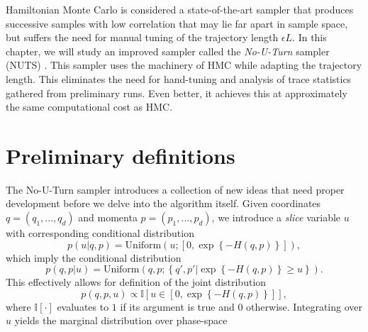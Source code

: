 Hamiltonian Monte Carlo is considered a state-of-the-art sampler that produces successive samples with low correlation
that may lie far apart in sample space, 
but suffers the need for manual tuning of the trajectory length $\epsilon L$. 
In this chapter, we will study an improved sampler called the \textit{No-U-Turn} sampler (NUTS) \cite{nuts}. This sampler uses the machinery of HMC while adapting the trajectory length. This eliminates the need for hand-tuning and analysis of trace statistics gathered from preliminary runs. Even better, it achieves this at approximately the same computational cost as HMC. 

\section{Preliminary definitions}
The No-U-Turn sampler introduces a collection of new ideas that need proper development before we delve into the algorithm itself.
Given coordinates $q = (q_1, ..., q_d)$ and  momenta $p = (p_1, ..., p_d)$, we introduce a \textit{slice} variable $u$
with corresponding conditional distribution
\begin{equation}
    p(u|q, p) = \text{Uniform}\left(u; \left[0, \exp\left\{-H(q, p)\right\}\right]\right),
\end{equation}
which imply the conditional distribution
\begin{equation}
    p(q, p|u) = \text{Uniform}\left( q, p; \left\{q', p' \bigg| \exp\left\{-H(q, p)\right\} \geq u \right\} \right).
\end{equation}
This effectively allows for definition of the joint distribution
\begin{equation}
    p(q, p, u) \propto \mathbb{I}\left[u \in \left[0, \exp\left\{-H(q, p)\right\}\right]\right],
\end{equation}
where $\mathbb{I}[\cdot]$ evaluates to $1$ if its argument is true and $0$ otherwise. Integrating over $u$ yields the marginal distribution
over phase-space

